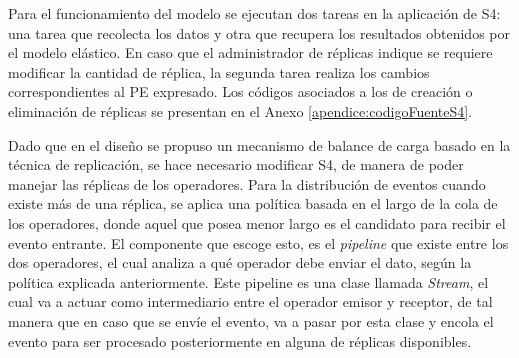 %

Para el funcionamiento del modelo se ejecutan dos tareas en la aplicación de S4: una tarea que recolecta los datos y otra que recupera los resultados obtenidos por el modelo elástico. En caso que el administrador de réplicas indique se requiere modificar la cantidad de réplica, la segunda tarea realiza los cambios correspondientes al PE expresado. Los códigos asociados a los de creación o eliminación de réplicas se presentan en el Anexo \ref{apendice:codigoFuenteS4}.

Dado que en el diseño se propuso un mecanismo de balance de carga basado en la técnica de replicación, se hace necesario modificar S4, de manera de poder manejar las réplicas de los operadores. Para la distribución de eventos cuando existe más de una réplica, se aplica una política basada en el largo de la cola de los operadores, donde aquel que posea menor largo es el candidato para recibir el evento entrante. \normalsize{El componente que escoge esto, es el \textit{pipeline} que existe entre los dos operadores, el cual analiza a qué operador debe enviar el dato, según la política explicada anteriormente. Este pipeline es una clase llamada \textit{Stream}, el cual va a actuar como intermediario entre el operador emisor y receptor, de tal manera que en caso que se envíe el evento, va a pasar por esta clase y encola el evento para ser procesado posteriormente en alguna de réplicas disponibles.}

